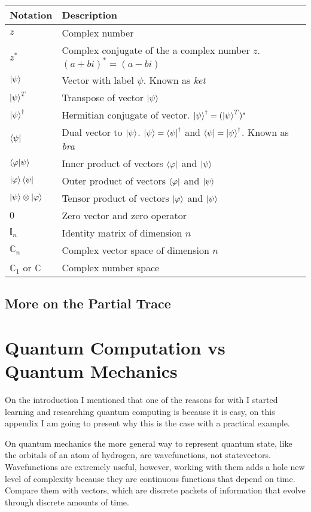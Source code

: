 \begin{tabular}{ p{2cm}|p{12cm} }
	\hline
	Notation & Description \\
	\hline
	\hline
	$z$ & Complex number    \\
	$z^{*}$ & Complex conjugate of the a complex number $z$. $(a+ bi)^{*} = (a -bi)$\\
	$\ket{\psi} $ & Vector with label $\psi$. Known as \textit{ket}\\
	$\ket{\psi}^T$ & Transpose of vector $\ket{\psi}$ \\
	$\ket{\psi}^\dag $ &  Hermitian conjugate of vector. $\ket{\psi}^\dag = (\ket{\psi}^T)^* $\\
	$\bra{\psi} $ & Dual vector to $\ket{\psi}$. $ \ket{\psi} = \bra{\psi}^{\dag}$ and $\bra{\psi} = \ket{\psi}^\dag$. Known as \textit{bra}\\
	$ \bra{\varphi}\ket{\psi} $ & Inner product of vectors $\bra{\varphi}$ and $\ket{\psi}$ \\
	$ \ket{\varphi}\bra{\psi} $ & Outer product of vectors $\bra{\varphi}$ and $\ket{\psi}$ \\
	$ \ket{\psi}\otimes\ket{\varphi}$ & Tensor product of vectors $\ket{\varphi}$ and $\ket{\psi}$ \\
	$ 0 $ & Zero vector and zero operator \\
	$ \mathbb{I}_n $ & Identity matrix of dimension $n$ \\
	$ \mathbb{C}_n $ & Complex vector space of dimension $n$ \\
	$ \mathbb{C}_1$ or $\mathbb{C} $ & Complex number space \\
	
\end{tabular}
\section{More on the Partial Trace}

\chapter{Quantum Computation vs Quantum Mechanics}
On the introduction I mentioned that one of the reasons for with I started learning and researching quantum computing is because it is easy, on this appendix I am going to present why this is the case with a practical example.

On quantum mechanics the more general way to represent quantum state, like the orbitals of an atom of hydrogen, are wavefunctions, not statevectors. Wavefunctions are extremely useful, however, working with them adds a hole new level of complexity because they are continuous functions that depend on time. Compare them with vectors, which are discrete packets of information that evolve through discrete amounts of time.

